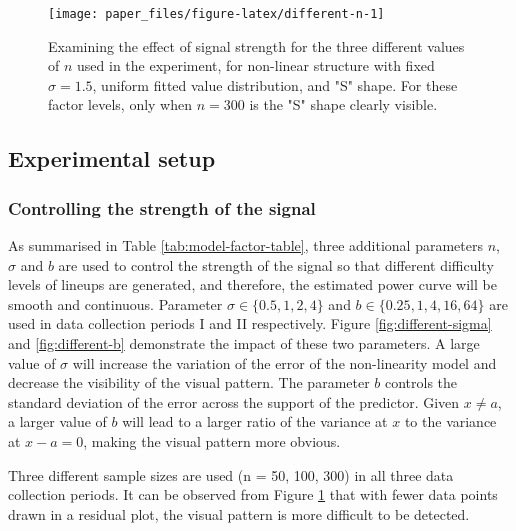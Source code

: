 \documentclass[]{interact}
\theoremstyle{plain}%
\theoremstyle{definition}
\theoremstyle{remark}
\begin{document}
\begin{figure}

{\centering \texttt{[image: paper\_files/figure-latex/different-n-1]} 

}

\caption{Examining the effect of signal strength for the three different values of $n$ used in the experiment, for non-linear structure with fixed $\sigma = 1.5$, uniform fitted value distribution, and "S" shape. For these factor levels, only when $n = 300$ is the "S" shape clearly visible.}\label{fig:different-n}
\end{figure}

\hypertarget{experimental-setup}{%
\subsection{Experimental setup}\label{experimental-setup}}

\hypertarget{controlling-the-strength-of-the-signal}{%
\subsubsection{Controlling the strength of the
signal}\label{controlling-the-strength-of-the-signal}}

As summarised in Table \ref{tab:model-factor-table}, three additional
parameters \(n\), \(\sigma\) and \(b\) are used to control the strength
of the signal so that different difficulty levels of lineups are
generated, and therefore, the estimated power curve will be smooth and
continuous. Parameter \(\sigma \in \{0.5, 1, 2, 4\}\) and
\(b \in \{0.25, 1, 4, 16, 64\}\) are used in data collection periods I
and II respectively. Figure \ref{fig:different-sigma} and
\ref{fig:different-b} demonstrate the impact of these two parameters. A
large value of \(\sigma\) will increase the variation of the error of
the non-linearity model and decrease the visibility of the visual
pattern. The parameter \(b\) controls the standard deviation of the
error across the support of the predictor. Given \(x \neq a\), a larger
value of \(b\) will lead to a larger ratio of the variance at \(x\) to
the variance at \(x - a = 0\), making the visual pattern more obvious.

Three different sample sizes are used (n = 50, 100, 300) in all three
data collection periods. It can be observed from Figure
\ref{fig:different-n} that with fewer data points drawn in a residual
plot, the visual pattern is more difficult to be detected.
\end{document}
